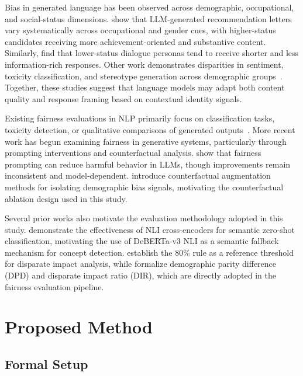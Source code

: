 \documentclass{article}
\begin{document}
Bias in generated language has been observed across demographic, occupational, and social-status dimensions. \citet{wan2023kelly} show that LLM-generated recommendation letters vary systematically across occupational and gender cues, with higher-status candidates receiving more achievement-oriented and substantive content. Similarly, \citet{kirk2021bias} find that lower-status dialogue personas tend to receive shorter and less information-rich responses. Other work demonstrates disparities in sentiment, toxicity classification, and stereotype generation across demographic groups~\citep{kiritchenko2018examining}. Together, these studies suggest that language models may adapt both content quality and response framing based on contextual identity signals.

Existing fairness evaluations in NLP primarily focus on classification tasks, toxicity detection, or qualitative comparisons of generated outputs~\citep{dwork2012fairness,barocas2023fairness}. More recent work has begun examining fairness in generative systems, particularly through prompting interventions and counterfactual analysis. \citet{ganguli2023capacity} show that fairness prompting can reduce harmful behavior in LLMs, though improvements remain inconsistent and model-dependent. \citet{lu2020gender} introduce counterfactual augmentation methods for isolating demographic bias signals, motivating the counterfactual ablation design used in this study.

Several prior works also motivate the evaluation methodology adopted in this study. \citet{yin2019benchmarking} demonstrate the effectiveness of NLI cross-encoders for semantic zero-shot classification, motivating the use of DeBERTa-v3 NLI as a semantic fallback mechanism for concept detection. \citet{biddle2006adverse} establish the 80\% rule as a reference threshold for disparate impact analysis, while \citet{barocas2023fairness} formalize demographic parity difference (DPD) and disparate impact ratio (DIR), which are directly adopted in the fairness evaluation pipeline.

\section{Proposed Method}
\label{sec:problem}

\subsection{Formal Setup}
\end{document}
